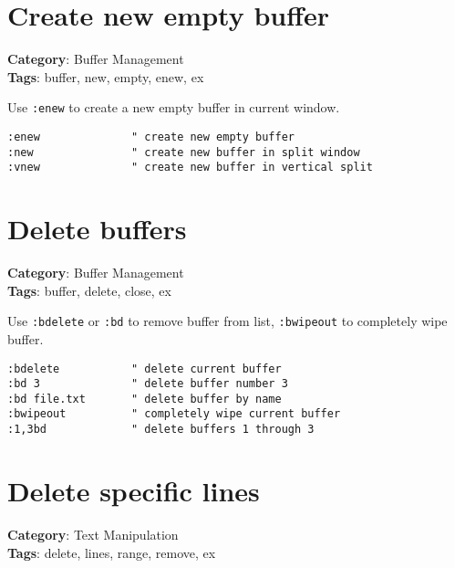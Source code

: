 {{{{{{\section{Create new empty buffer}

\textbf{Category}: Buffer Management\\ \textbf{Tags}: buffer, new, empty, enew, ex
\vspace{0.5cm}

Use {\footnotesize \Verb§:enew§} to create a new empty buffer in current window.

\begin{Exa*}{}
\begin{Verbatim}[fontsize=\footnotesize, breaklines, breakanywhere]
:enew              " create new empty buffer
:new               " create new buffer in split window
:vnew              " create new buffer in vertical split
\end{Verbatim}
\end{Exa*}

\section{Delete buffers}

\textbf{Category}: Buffer Management\\ \textbf{Tags}: buffer, delete, close, ex
\vspace{0.5cm}

Use {\footnotesize \Verb§:bdelete§} or {\footnotesize \Verb§:bd§} to remove buffer from list, {\footnotesize \Verb§:bwipeout§} to completely wipe buffer.

\begin{Exa*}{}
\begin{Verbatim}[fontsize=\footnotesize, breaklines, breakanywhere]
:bdelete           " delete current buffer
:bd 3              " delete buffer number 3
:bd file.txt       " delete buffer by name
:bwipeout          " completely wipe current buffer
:1,3bd             " delete buffers 1 through 3
\end{Verbatim}
\end{Exa*}

\section{Delete specific lines}

\textbf{Category}: Text Manipulation\\ \textbf{Tags}: delete, lines, range, remove, ex
\vspace{0.5cm}

}}}}}}
